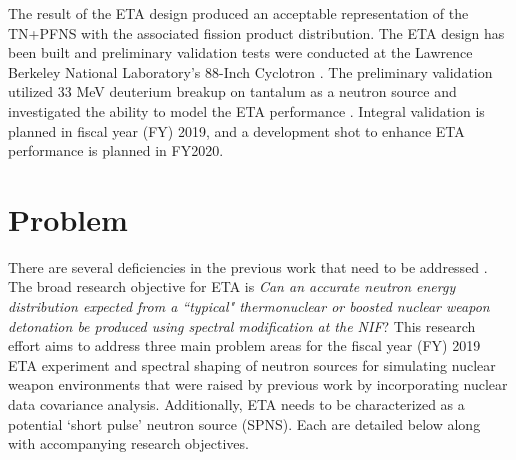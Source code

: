 The result of the ETA design produced an acceptable representation of the TN+PFNS with the associated fission product distribution. 
The ETA design has been built and preliminary validation tests were conducted at the Lawrence Berkeley National Laboratory’s 88-Inch Cyclotron \cite{Bevins, Stickney}. 
The preliminary validation utilized 33 MeV deuterium breakup on tantalum as a neutron source and investigated the ability to model the ETA performance \cite{Stickney}.
Integral validation is planned in fiscal year (FY) 2019, and a development shot to enhance ETA performance is planned in FY2020. 

 
\section{Problem} \label{problem}

There are several deficiencies in the previous work that need to be addressed \cite{Bevins}. The broad research objective for ETA is \textit{Can an accurate neutron energy distribution expected from a ``typical" thermonuclear or boosted nuclear weapon detonation be produced using spectral modification at the NIF}?
This research effort aims to address three main problem areas for the fiscal year (FY) 2019 ETA experiment and spectral shaping of neutron sources for simulating nuclear weapon environments that were raised by previous work by incorporating nuclear data covariance analysis.
Additionally, ETA needs to be characterized as a potential `short pulse' neutron source (SPNS). Each are detailed below along with accompanying research objectives.  

